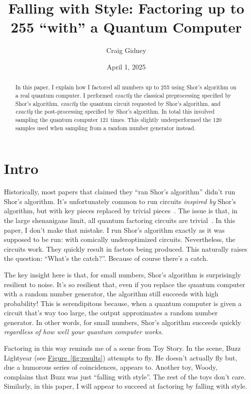 \documentclass{article}
\title{
Falling with Style: Factoring up to 255 ``with'' a Quantum Computer
}
\author{Craig Gidney}
\date{April 1, 2025}
\newcommand{\fig}[1]{\hyperref[fig:#1]{Figure~\ref*{fig:#1}}}
\begin{document}
\maketitle

\begin{abstract}
In this paper, I explain how I factored all numbers up to 255 using Shor's algorithm on a real quantum computer.
I performed \emph{exactly} the classical preprocessing specified by Shor's algorithm,
\emph{exactly} the quantum circuit requested by Shor's algorithm,
and \emph{exactly} the post-processing specified by Shor's algorithm.
In total this involved sampling the quantum computer 121 times.
This slightly underperformed the 120 samples used when sampling from a random number generator instead.
\end{abstract}

\section{Intro}

Historically, most papers that claimed they ``ran Shor's algorithm'' didn't run Shor's algorithm.
It's unfortunately common to run circuits \emph{inspired by} Shor's algorithm, but with key pieces replaced by trivial pieces~\cite{Vandersypen2001,Lanyon2007,Lu2007,MartnLpez2012,lucero2012}.
The issue is that, in the large shenanigans limit, all quantum factoring circuits are trivial~\cite{Smolin2013}.
In this paper, I don't make that mistake.
I run Shor's algorithm exactly as it was supposed to be run: with comically underoptimized circuits.
Nevertheless, the circuits work.
They quickly result in factors being produced.
This naturally raises the question: ``What's the catch?''.
Because of course there's a catch.

The key insight here is that, for small numbers, Shor's algorithm is surprisingly resilient to noise.
It's so resilient that, even if you replace the quantum computer with a random number generator, the algorithm still succeeds with high probability!
This is serendipitous because, when a quantum computer is given a circuit that's way too large, the output approximates a random number generator.
In other words, for small numbers, Shor's algorithm succeeds quickly \emph{regardless of how well your quantum computer works}.

Factoring in this way reminds me of a scene from Toy Story.
In the scene, Buzz Lightyear (see \fig{results}) attempts to fly.
He doesn't actually fly but, due a humorous series of coincidences, appears to.
Another toy, Woody, complains that Buzz was just ``falling with style''.
The rest of the toys don't care.
Similarly, in this paper, I will appear to succeed at factoring by falling with style.
\end{document}
